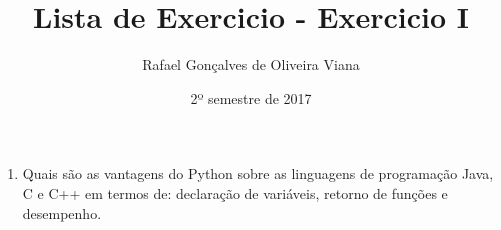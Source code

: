 \documentclass[12pt]{article}
\title{Lista de Exercicio  - Exercicio I }
\author{Rafael Gonçalves de  Oliveira Viana}
\date{2º semestre de 2017}
\begin{document}
\maketitle

\begin{enumerate}
\item
Quais são as vantagens do Python sobre as linguagens de programação Java, C e C++
em termos de: declaração de variáveis, retorno de funções e desempenho.
\end{enumerate}
\end{document}
